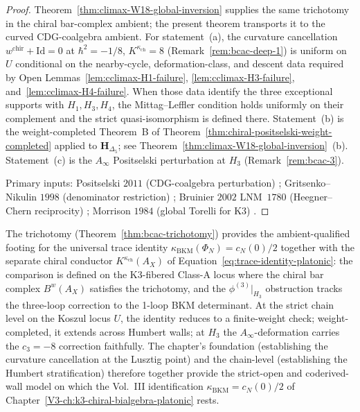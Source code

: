 \begin{proof}
Theorem~\ref{thm:climax-W18-global-inversion} supplies the same
trichotomy in the chiral bar-complex ambient; the present theorem
transports it to the curved CDG-coalgebra ambient. For statement~(a),
the curvature cancellation
$w^{\mathrm{chir}} + \mathrm{Id} = 0$ at $\hbar^2 = -1/8$,
$K^{\kappa_{\mathrm{ch}}} = 8$
(Remark~\ref{rem:bcac-deep-1}) is uniform on $U$ conditional on the
nearby-cycle, deformation-class, and descent data required by Open
Lemmas~\ref{lem:cclimax-H1-failure},
\ref{lem:cclimax-H3-failure}, and~\ref{lem:cclimax-H4-failure}.
When those data identify the three exceptional supports with
$H_1,H_3,H_4$, the Mittag--Leffler condition holds uniformly on their
complement and the strict quasi-isomorphism is defined there.
Statement~(b) is the weight-completed Theorem~B of
Theorem~\ref{thm:chiral-positselski-weight-completed} applied to
$\mathbf{H}_{\Delta_5}$; see
Theorem~\ref{thm:climax-W18-global-inversion}~(b). Statement~(c)
is the $A_\infty$ Positselski perturbation at $H_3$
(Remark~\ref{rem:bcac-3}).

Primary inputs: Positselski $2011$
(CDG-coalgebra perturbation) \cite{Positselski11};
Gritsenko--Nikulin $1998$ (denominator restriction)
\cite{GritsenkoNikulin1998};
Bruinier $2002$ LNM~$1780$ (Heegner--Chern reciprocity)
\cite{Bruinier2002LNM}; Morrison $1984$ (global Torelli for K3)
\cite{Morrison84}.
\end{proof}

\begin{remark}[Relation to the Vol.~III
$\kappa_{\mathrm{BKM}} = c_N(0)/2$ identity]
\label{rem:bcac-5}
The trichotomy
(Theorem~\ref{thm:bcac-trichotomy}) provides the
ambient-qualified footing for the universal trace identity
$\kappa_{\mathrm{BKM}}(\Phi_N)=c_N(0)/2$ together with the separate
chiral conductor $K^{\kappa_{\mathrm{ch}}}(A_X)$ of
Equation~\eqref{eq:trace-identity-platonic}: the comparison is
defined on the K3-fibered Class-A locus where the chiral bar
complex $B^w(A_X)$ satisfies the trichotomy, and the
$\phi^{(3)}|_{H_3}$ obstruction tracks the three-loop correction
to the 1-loop BKM determinant. At the strict chain level on the
Koszul locus $U$, the identity reduces to a finite-weight check;
weight-completed, it extends across Humbert walls; at $H_3$ the
$A_\infty$-deformation carries the $c_3 = -8$ correction
faithfully. The chapter's foundation (establishing the
curvature cancellation at the Lusztig point) and the chain-level
(establishing the Humbert stratification) therefore together
provide the strict-open and coderived-wall model on which the Vol.~III
identification $\kappa_{\mathrm{BKM}} = c_N(0)/2$ of
Chapter~\ref{V3-ch:k3-chiral-bialgebra-platonic} rests.
\end{remark}

